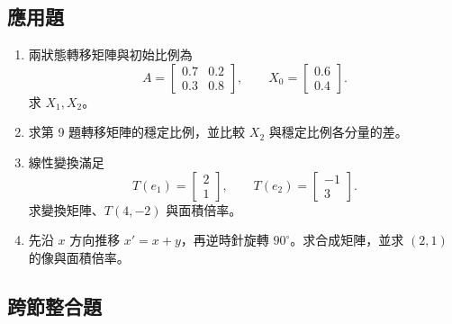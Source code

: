 \documentclass[11pt,a4paper]{article}
\begin{document}
\subsection{應用題}\label{ux61c9ux7528ux984c}

\begin{enumerate}
\def\labelenumi{\arabic{enumi}.}
\setcounter{enumi}{8}
\item
  兩狀態轉移矩陣與初始比例為
  \[
  A=\begin{bmatrix}0.7&0.2\\0.3&0.8\end{bmatrix},
  \qquad
  X_0=\begin{bmatrix}0.6\\0.4\end{bmatrix}.
  \]
  求 \(X_1,X_2\)。
\item
  求第 9 題轉移矩陣的穩定比例，並比較 \(X_2\) 與穩定比例各分量的差。
\item
  線性變換滿足
  \[
  T(e_1)=\begin{bmatrix}2\\1\end{bmatrix},
  \qquad
  T(e_2)=\begin{bmatrix}-1\\3\end{bmatrix}.
  \]
  求變換矩陣、\(T(4,-2)\) 與面積倍率。
\item
  先沿 \(x\) 方向推移 \(x'=x+y\)，再逆時針旋轉 \(90^\circ\)。求合成矩陣，並求 \((2,1)\) 的像與面積倍率。
\end{enumerate}

\subsection{跨節整合題}\label{ux8de8ux7bc0ux6574ux5408ux984c}
\end{document}
